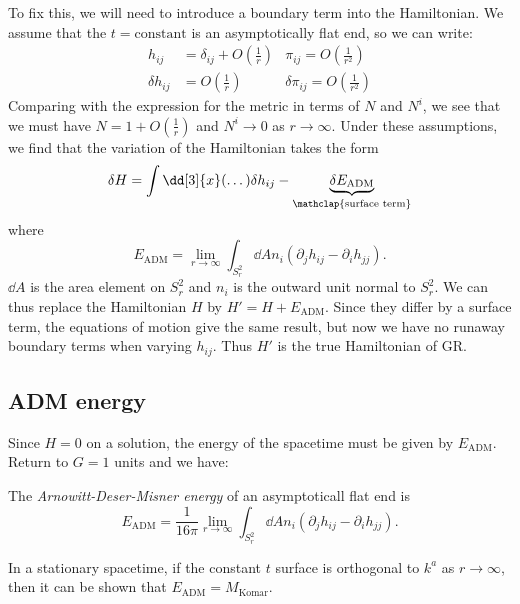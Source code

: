 \documentclass{jknotes}
\begin{document}
To fix this, we will need to introduce a boundary term into the Hamiltonian. We assume that the \(t = \text{constant}\) is an asymptotically flat end, so we can write:
\begin{align}
    h_{ij} &= \delta_{ij} + O\left(\frac{1}{r}\right) & \pi_{ij} = O\left(\frac{1}{r^2}\right) \\
    \delta h_{ij} &= O\left(\frac{1}{r}\right) & \delta\pi_{ij} = O\left(\frac{1}{r^2}\right)
\end{align}
Comparing with the expression for the metric in terms of \(N\) and \(N^i\), we see that we must have \(N=1+O\left(\frac{1}{r}\right)\) and \(N^i\to0\) as \(r\to \infty\). Under these assumptions, we find that the variation of the Hamiltonian takes the form
\begin{equation}
    \delta H = \int\dd[3]{x}(\dots)\delta h_{ij} - \underbrace{\delta E_{\text{ADM}}}_{\mathclap{\text{surface term}}}
\end{equation}
where
\begin{equation}
    E_{\text{ADM}} = \lim_{r\to\infty} \int_{S^2_r} \dd{A} n_i (\partial_j h_{ij} - \partial_i h_{jj}).
\end{equation}
\(\dd{A}\) is the area element on \(S^2_r\) and \(n_i\) is the outward unit normal to \(S^2_r\). We can thus replace the Hamiltonian \(H\) by \(H' = H + E_{\text{ADM}}\). Since they differ by a surface term, the equations of motion give the same result, but now we have no runaway boundary terms when varying \(h_{ij}\). Thus \(H'\) is the true Hamiltonian of GR.

\subsection{ADM energy}
Since \(H = 0\) on a solution, the energy of the spacetime must be given by \(E_{\text{ADM}}\). Return to \(G=1\) units and we have:
\begin{defn}
    The \emph{Arnowitt-Deser-Misner energy} of an asymptoticall flat end is
    \begin{equation}
        E_{\text{ADM}} = \frac{1}{16\pi}\lim_{r\to\infty}\int_{S^2_r}\dd{A}n_i(\partial_j h_{ij} - \partial_i h_{jj}).
    \end{equation}
\end{defn}

In a stationary spacetime, if the constant \(t\) surface is orthogonal to \(k^a\) as \(r\to\infty\), then it can be shown that \(E_{\text{ADM}} = M_{\text{Komar}}\).
\end{document}
